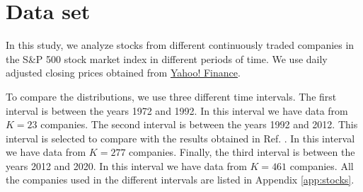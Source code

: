 \section{Data set}\label{sec:data_set}

In this study, we analyze stocks from different continuously traded companies
in the S\&P 500 stock market index in different periods of time. We use daily
adjusted closing prices obtained from
\href{https://finance.yahoo.com/}{Yahoo! Finance}.

To compare the distributions, we use three different time intervals. The first
interval is between the years 1972 and 1992. In this interval we have data from
$K = 23$ companies. The second interval is between the years 1992 and 2012.
This interval is selected to compare with the results obtained in Ref.
\cite{non_stationarity_fin_guhr}. In this interval we have data from $K = 277$
companies. Finally, the third interval is between the years 2012 and 2020. In
this interval we have data from $K = 461$ companies. All the companies used in
the different intervals are listed in Appendix \ref{app:stocks}.